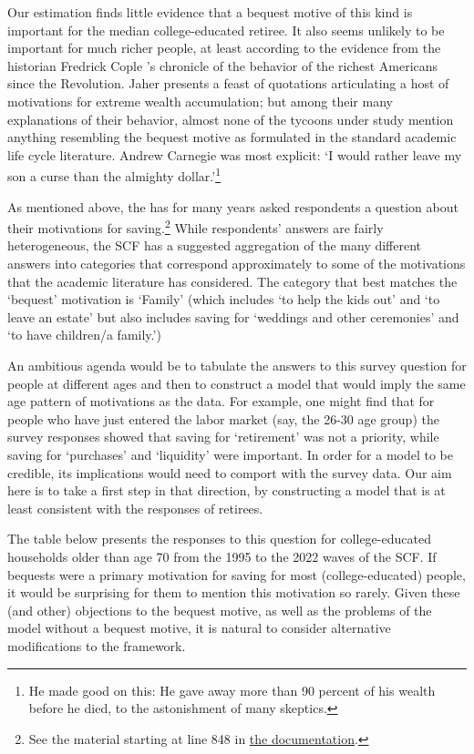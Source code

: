 \documentclass{article}
\begin{document}
Our estimation finds little evidence that a bequest motive of this kind is important for the median college-educated retiree.
It also seems unlikely to be important for much richer people, at least according to the evidence from the historian Fredrick Cople \cite{jaherGilded}'s chronicle of the behavior of the richest Americans since the Revolution.
Jaher presents a feast of quotations articulating a host of motivations for extreme wealth accumulation; but among their many explanations of their behavior, almost none of the tycoons under study mention anything resembling the bequest motive as formulated in the standard academic life cycle literature.
Andrew Carnegie was most explicit: `I would rather leave my son a curse than the almighty dollar.'\footnote{He made good on this: He gave away more than 90 percent of his wealth before he died, to the astonishment of many skeptics.}

As mentioned above, the \cite{2023} has for many years asked respondents a question about their motivations for saving.\footnote{See the material starting at line 848 in \href{https://www.federalreserve.gov/econres/files/bulletin.macro.txt}{the documentation}.}
While respondents' answers are fairly heterogeneous, the SCF has a suggested aggregation of the many different answers into categories that correspond approximately to some of the motivations that the academic literature has considered.
The category that best matches the `bequest' motivation is `Family' (which includes `to help the kids out' and `to leave an estate' but also includes saving for `weddings and other ceremonies' and `to have children/a family.')

An ambitious agenda would be to tabulate the answers to this survey question for people at different ages and then to construct a model that would imply the same age pattern of motivations as the data.
For example, one might find that for people who have just entered the labor market (say, the 26-30 age group) the survey responses showed that saving for `retirement' was not a priority, while saving for `purchases' and `liquidity' were important.
In order for a model to be credible, its implications would need to comport with the survey data.
Our aim here is to take a first step in that direction, by constructing a model that is at least consistent with the responses of retirees.

The table below presents the responses to this question for college-educated households older than age 70 from the 1995 to the 2022 waves of the SCF.
If bequests were a primary motivation for saving for most (college-educated) people, it would be surprising for them to mention this motivation so rarely.
Given these (and other) objections to the bequest motive, as well as the problems of the model without a bequest motive, it is natural to consider alternative modifications to the framework.
\end{document}
